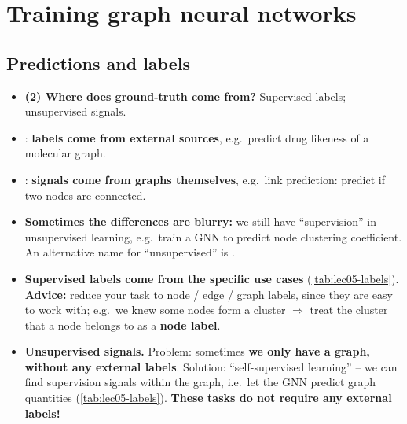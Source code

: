 \section{Training graph neural networks}\label{sec:lec05-train}

\subsection{Predictions and labels}\label{sec:lec05-labels}

\begin{itemize}
  \item \textbf{(2) Where does ground-truth come from?} Supervised labels;
    unsupervised signals.
  \item {}: \textbf{labels come from external
    sources}, e.g.\ predict drug likeness of a molecular graph.
  \item {}: \textbf{signals come from graphs
    themselves}, e.g.\ link prediction: predict if two nodes are connected.
  \item \textbf{Sometimes the differences are blurry:} we still have
    ``supervision'' in unsupervised learning, e.g.\ train a GNN to predict node
    clustering coefficient. An alternative name for ``unsupervised'' is
    .
  \item \textbf{Supervised labels come from the specific use cases}
    (\cref{tab:lec05-labels}). \textbf{Advice:} reduce your task to node / edge
    / graph labels, since they are easy to work with; e.g.\ we knew some nodes
    form a cluster $\Rightarrow$ treat the cluster that a node belongs to as a
    \textbf{node label}.
  \item \textbf{Unsupervised signals.} Problem: sometimes \textbf{we only have
    a graph, without any external labels}. Solution: ``self-supervised
    learning'' -- we can find supervision signals within the graph, i.e.\ let
    the GNN predict graph quantities (\cref{tab:lec05-labels}). \textbf{These
    tasks do not require any external labels!}
\end{itemize}

